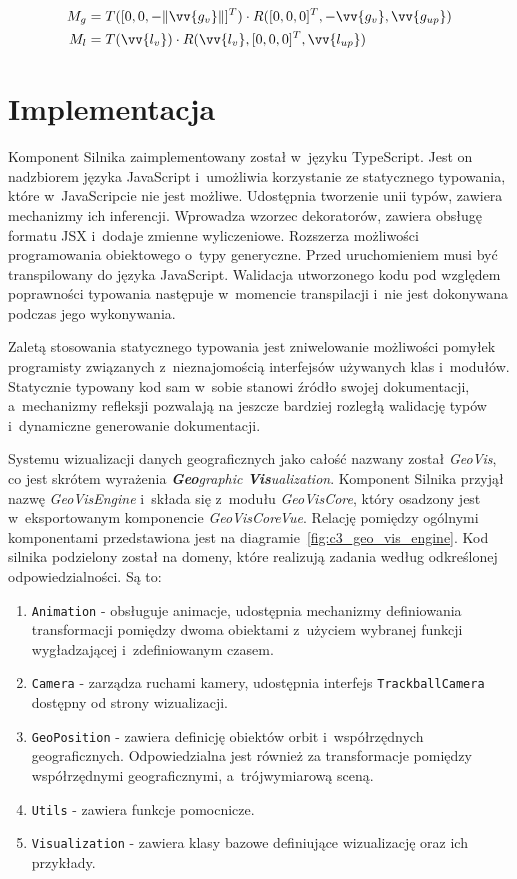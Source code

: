 \begin{align}
    \label{eq:t_1}
      M_g &= T([0, 0, -\Vert\vv{g_v}\Vert]^T) \cdot R([0, 0, 0]^T, -\vv{g_v}, \vv{g_{up}}) \\
    \label{eq:t_2}
      M_l &= T(\vv{l_v}) \cdot R(\vv{l_v}, [0, 0, 0]^T, \vv{l_{up}})
\end{align}

\section{Implementacja}

Komponent Silnika zaimplementowany został w~języku TypeScript\cite{TypeScript}. Jest on nadzbiorem języka JavaScript i~umożliwia korzystanie ze statycznego typowania, które w~JavaScripcie nie jest możliwe. Udostępnia tworzenie unii typów, zawiera mechanizmy ich inferencji. Wprowadza wzorzec dekoratorów, zawiera obsługę formatu JSX i~dodaje zmienne wyliczeniowe. Rozszerza możliwości programowania obiektowego o~typy generyczne. Przed uruchomieniem musi być transpilowany do języka JavaScript. Walidacja utworzonego kodu pod względem poprawności typowania następuje w~momencie transpilacji i~nie jest dokonywana podczas jego wykonywania. 

Zaletą stosowania statycznego typowania jest zniwelowanie możliwości pomyłek programisty związanych z~nieznajomością interfejsów używanych klas i~modułów. Statycznie typowany kod sam w~sobie stanowi źródło swojej dokumentacji, a~mechanizmy refleksji pozwalają na jeszcze bardziej rozległą walidację typów i~dynamiczne generowanie dokumentacji.

Systemu wizualizacji danych geograficznych jako całość nazwany został \textit{GeoVis}, co jest skrótem wyrażenia \textit{\textbf{Geo}graphic \textbf{Vis}ualization}. Komponent Silnika przyjął nazwę \mbox{\textit{GeoVisEngine}} i~składa się z~modułu \mbox{\textit{GeoVisCore}}, który osadzony jest w~eksportowanym komponencie \mbox{\textit{GeoVisCoreVue}}. Relację pomiędzy ogólnymi komponentami przedstawiona jest na diagramie~\ref{fig:c3_geo_vis_engine}. Kod silnika podzielony został na domeny, które realizują zadania według odkreślonej odpowiedzialności. Są to:

\begin{enumerate}
    \item \texttt{Animation} - obsługuje animacje, udostępnia mechanizmy definiowania transformacji pomiędzy dwoma obiektami z~użyciem wybranej funkcji wygładzającej i~zdefiniowanym czasem.
    \item \texttt{Camera} - zarządza ruchami kamery, udostępnia interfejs \texttt{TrackballCamera} dostępny od strony wizualizacji.
    \item \texttt{GeoPosition} - zawiera definicję obiektów orbit i~współrzędnych geograficznych. Odpowiedzialna jest również za transformacje pomiędzy współrzędnymi geograficznymi, a~trójwymiarową sceną.
    \item \texttt{Utils} - zawiera funkcje pomocnicze.
    \item \texttt{Visualization} - zawiera klasy bazowe definiujące wizualizację oraz ich przykłady.
\end{enumerate}

